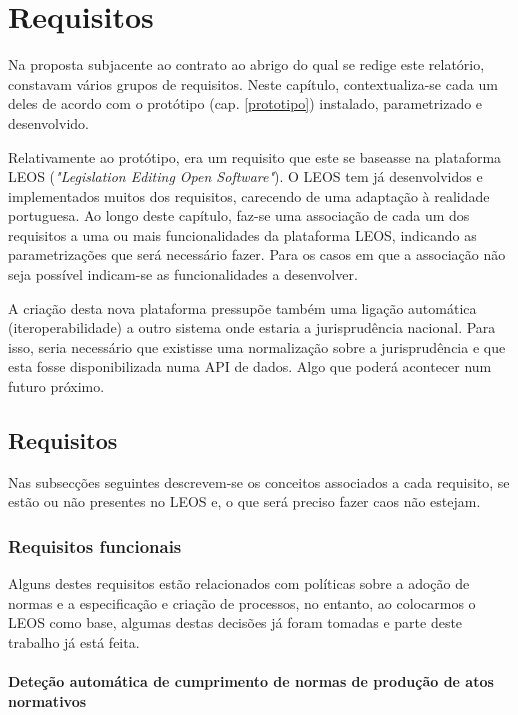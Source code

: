\chapter{Requisitos}
\label{requisitos}

Na proposta subjacente ao contrato ao abrigo do qual se redige este relatório, constavam vários grupos de requisitos.
Neste capítulo, contextualiza-se cada um deles de acordo com o protótipo (cap. \ref{prototipo}) instalado, parametrizado 
e desenvolvido.

Relativamente ao protótipo, era um requisito que este se baseasse na plataforma LEOS (\emph{"Legislation Editing Open Software"}).
O LEOS tem já desenvolvidos e implementados muitos dos requisitos, carecendo de uma adaptação à realidade portuguesa.
Ao longo deste capítulo, faz-se uma associação de cada um dos requisitos a uma ou mais funcionalidades da plataforma LEOS,
indicando as parametrizações que será necessário fazer. Para os casos em que a associação não seja possível indicam-se as 
funcionalidades a desenvolver.

A criação desta nova plataforma pressupõe também uma ligação automática (iteroperabilidade) a outro sistema onde estaria 
a jurisprudência nacional. Para isso, seria necessário que existisse uma normalização sobre a jurisprudência e que esta fosse 
disponibilizada numa API de dados. Algo que poderá acontecer num futuro próximo.

\section{Requisitos}

Nas subsecções seguintes descrevem-se os conceitos associados a cada requisito, se estão ou não presentes no LEOS e,
o que será preciso fazer caos não estejam.

\subsection{Requisitos funcionais}

Alguns destes requisitos estão relacionados com políticas sobre a adoção de normas e a especificação e 
criação de processos, no entanto,
ao colocarmos o LEOS como base, algumas destas decisões já foram tomadas e parte deste trabalho já está feita.

\subsubsection{Deteção automática de cumprimento de normas de produção de atos normativos}

